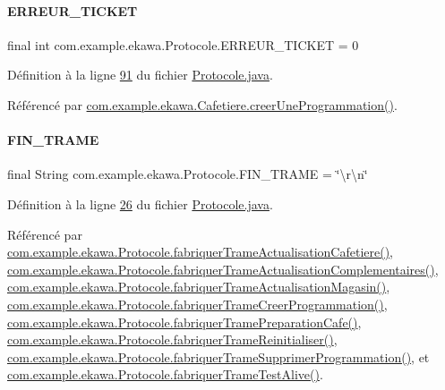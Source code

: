 \paragraph{\texorpdfstring{E\+R\+R\+E\+U\+R\+\_\+\+T\+I\+C\+K\+ET}{ERREUR\_TICKET}}
{\footnotesize\ttfamily final int com.\+example.\+ekawa.\+Protocole.\+E\+R\+R\+E\+U\+R\+\_\+\+T\+I\+C\+K\+ET = 0\hspace{0.3cm}{\ttfamily [static]}}



Définition à la ligne \hyperlink{_protocole_8java_source_l00091}{91} du fichier \hyperlink{_protocole_8java_source}{Protocole.\+java}.



Référencé par \hyperlink{_cafetiere_8java_source_l00731}{com.\+example.\+ekawa.\+Cafetiere.\+creer\+Une\+Programmation()}.

\mbox{\label{classcom_1_1example_1_1ekawa_1_1_protocole_aece1e2c0e4110c3d91fb69da213e847f}} 
\paragraph{\texorpdfstring{F\+I\+N\+\_\+\+T\+R\+A\+ME}{FIN\_TRAME}}
{\footnotesize\ttfamily final String com.\+example.\+ekawa.\+Protocole.\+F\+I\+N\+\_\+\+T\+R\+A\+ME = \char`\"{}\textbackslash{}r\textbackslash{}n\char`\"{}\hspace{0.3cm}{\ttfamily [static]}}



Définition à la ligne \hyperlink{_protocole_8java_source_l00026}{26} du fichier \hyperlink{_protocole_8java_source}{Protocole.\+java}.



Référencé par \hyperlink{_protocole_8java_source_l00145}{com.\+example.\+ekawa.\+Protocole.\+fabriquer\+Trame\+Actualisation\+Cafetiere()}, \hyperlink{_protocole_8java_source_l00165}{com.\+example.\+ekawa.\+Protocole.\+fabriquer\+Trame\+Actualisation\+Complementaires()}, \hyperlink{_protocole_8java_source_l00155}{com.\+example.\+ekawa.\+Protocole.\+fabriquer\+Trame\+Actualisation\+Magasin()}, \hyperlink{_protocole_8java_source_l00175}{com.\+example.\+ekawa.\+Protocole.\+fabriquer\+Trame\+Creer\+Programmation()}, \hyperlink{_protocole_8java_source_l00099}{com.\+example.\+ekawa.\+Protocole.\+fabriquer\+Trame\+Preparation\+Cafe()}, \hyperlink{_protocole_8java_source_l00126}{com.\+example.\+ekawa.\+Protocole.\+fabriquer\+Trame\+Reinitialiser()}, \hyperlink{_protocole_8java_source_l00193}{com.\+example.\+ekawa.\+Protocole.\+fabriquer\+Trame\+Supprimer\+Programmation()}, et \hyperlink{_protocole_8java_source_l00116}{com.\+example.\+ekawa.\+Protocole.\+fabriquer\+Trame\+Test\+Alive()}.

